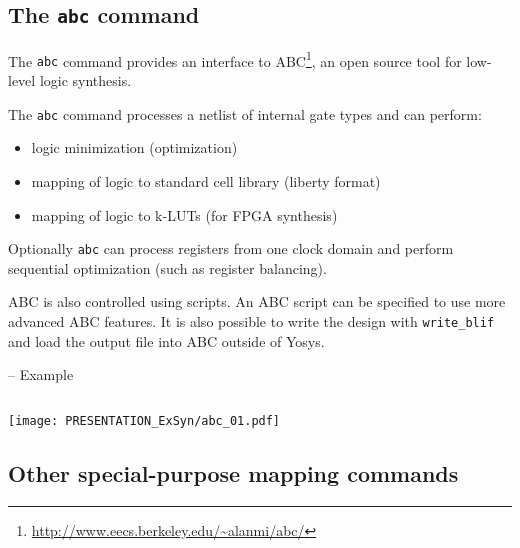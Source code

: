 
\subsection{The {\tt abc} command}

\begin{frame}{\subsecname}
The {\tt abc} command provides an interface to ABC\footnote[frame]{\url{http://www.eecs.berkeley.edu/~alanmi/abc/}},
an open source tool for low-level logic synthesis.

\medskip
The {\tt abc} command processes a netlist of internal gate types and can perform:
\begin{itemize}
\item logic minimization (optimization)
\item mapping of logic to standard cell library (liberty format)
\item mapping of logic to k-LUTs (for FPGA synthesis)
\end{itemize}

\medskip
Optionally {\tt abc} can process registers from one clock domain and perform
sequential optimization (such as register balancing).

\medskip
ABC is also controlled using scripts. An ABC script can be specified to use
more advanced ABC features. It is also possible to write the design with
{\tt write\_blif} and load the output file into ABC outside of Yosys.
\end{frame}

\begin{frame}[fragile]{\subsecname{} -- Example}
\begin{columns}
\column[t]{5cm}

\column[t]{5cm}

\end{columns}
\texttt{[image: PRESENTATION\_ExSyn/abc\_01.pdf]}
\end{frame}


\subsection{Other special-purpose mapping commands}

